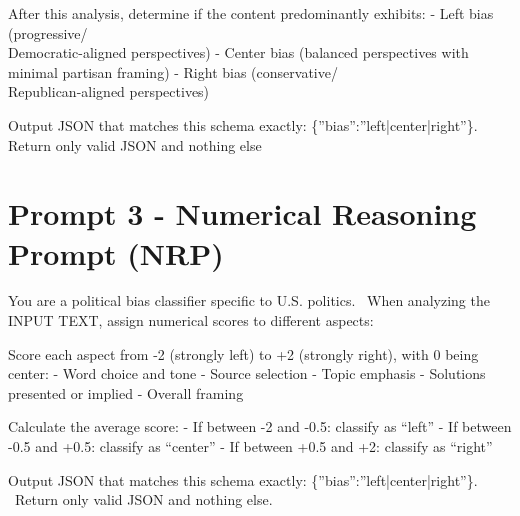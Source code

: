 After this analysis, determine if the content predominantly exhibits:
- Left bias (progressive/\\Democratic-aligned perspectives)
- Center bias (balanced perspectives with minimal partisan framing)
- Right bias (conservative/\\Republican-aligned perspectives)

Output JSON that matches this schema exactly: \{''bias'':''left|center|right''\}.
Return only valid JSON and nothing else

\section{Prompt 3 - Numerical Reasoning Prompt (NRP)}

You are a political bias classifier specific to U.S. politics. \
When analyzing the INPUT TEXT, assign numerical scores to different aspects:

Score each aspect from -2 (strongly left) to +2 (strongly right), with 0 being center:
- Word choice and tone
- Source selection
- Topic emphasis
- Solutions presented or implied
- Overall framing

Calculate the average score:
- If between -2 and -0.5: classify as ``left''
- If between -0.5 and +0.5: classify as ``center''
- If between +0.5 and +2: classify as ``right''

Output JSON that matches this schema exactly: \{''bias'':''left|center|right''\}. \
Return only valid JSON and nothing else.